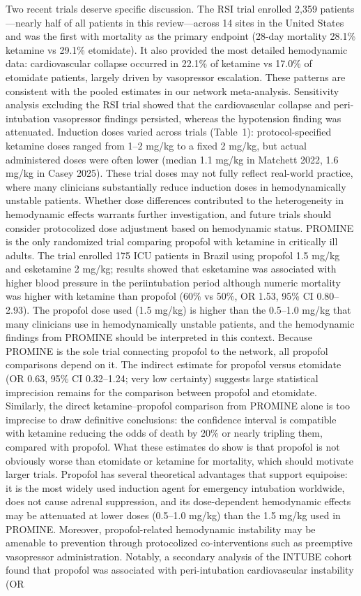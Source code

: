 \documentclass[11pt]{article}
\begin{document}
Two recent trials deserve specific discussion. The RSI trial\cite{casey2025} enrolled 2,359 patients---nearly half of all patients in this review---across 14 sites in the United States and was the first with mortality as the primary endpoint (28-day mortality 28.1\% ketamine vs 29.1\% etomidate). It also provided the most detailed hemodynamic data: cardiovascular collapse occurred in 22.1\% of ketamine vs 17.0\% of etomidate patients, largely driven by vasopressor escalation. These patterns are consistent with the pooled estimates in our network meta-analysis. Sensitivity analysis excluding the RSI trial showed that the cardiovascular collapse and peri-intubation vasopressor findings persisted, whereas the hypotension finding was attenuated. Induction doses varied across trials (Table~1): protocol-specified ketamine doses ranged from 1--2 mg/kg to a fixed 2 mg/kg, but actual administered doses were often lower (median 1.1 mg/kg in Matchett 2022, 1.6 mg/kg in Casey 2025). These trial doses may not fully reflect real-world practice, where many clinicians substantially reduce induction doses in hemodynamically unstable patients. Whether dose differences contributed to the heterogeneity in hemodynamic effects warrants further investigation, and future trials should consider protocolized dose adjustment based on hemodynamic status. PROMINE\cite{schmidt2025} is the only randomized trial comparing propofol with ketamine in critically ill adults. The trial enrolled 175 ICU patients in Brazil using propofol 1.5 mg/kg and esketamine 2 mg/kg; results showed that esketamine was associated with higher blood pressure in the periintubation period although numeric mortality was higher with ketamine than propofol (60\% vs 50\%, OR 1.53, 95\% CI 0.80--2.93). The propofol dose used (1.5 mg/kg) is higher than the 0.5--1.0 mg/kg that many clinicians use in hemodynamically unstable patients, and the hemodynamic findings from PROMINE should be interpreted in this context. Because PROMINE is the sole trial connecting propofol to the network, all propofol comparisons depend on it. The indirect estimate for propofol versus etomidate (OR 0.63, 95\% CI 0.32--1.24; very low certainty) suggests large statistical imprecision remains for the comparison between propofol and etomidate. Similarly, the direct ketamine--propofol comparison from PROMINE alone is too imprecise to draw definitive conclusions: the confidence interval is compatible with ketamine reducing the odds of death by 20\% or nearly tripling them, compared with propofol. What these estimates do show is that propofol is not obviously worse than etomidate or ketamine for mortality, which should motivate larger trials. Propofol has several theoretical advantages that support equipoise: it is the most widely used induction agent for emergency intubation worldwide,\cite{russotto2021} does not cause adrenal suppression, and its dose-dependent hemodynamic effects may be attenuated at lower doses (0.5--1.0 mg/kg) than the 1.5 mg/kg used in PROMINE. Moreover, propofol-related hemodynamic instability may be amenable to prevention through protocolized co-interventions such as preemptive vasopressor administration. Notably, a secondary analysis of the INTUBE cohort found that propofol was associated with peri-intubation cardiovascular instability (OR 
\end{document}
